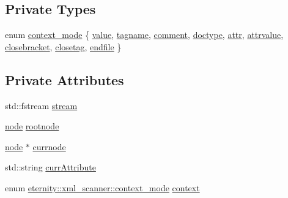 \subsection*{Private Types}
\begin{DoxyCompactItemize}
\item 
enum \hyperlink{classeternity_1_1xml__scanner_a97fff18c2e2004f157a42001010b84cf}{context\+\_\+mode} \{ \newline
\hyperlink{classeternity_1_1xml__scanner_a97fff18c2e2004f157a42001010b84cfafa4eb63a1562f8403e6290141b483953}{value}, 
\hyperlink{classeternity_1_1xml__scanner_a97fff18c2e2004f157a42001010b84cfa9f421ec01218dc95c7bbcf16b96e00e5}{tagname}, 
\hyperlink{classeternity_1_1xml__scanner_a97fff18c2e2004f157a42001010b84cfa72a94f7b59d1b819aee70647064ac738}{comment}, 
\hyperlink{classeternity_1_1xml__scanner_a97fff18c2e2004f157a42001010b84cfa3f58de11b0fa73c3cfae9a0f990ced7d}{doctype}, 
\newline
\hyperlink{classeternity_1_1xml__scanner_a97fff18c2e2004f157a42001010b84cfaa4dbf1aab1b22a99e30b0e0e1fc77f88}{attr}, 
\hyperlink{classeternity_1_1xml__scanner_a97fff18c2e2004f157a42001010b84cfa5ea488921462f42a286fe41414bdf6d2}{attrvalue}, 
\hyperlink{classeternity_1_1xml__scanner_a97fff18c2e2004f157a42001010b84cfa7e4bc6d8b6504245a90dd6d7b051fc07}{closebracket}, 
\hyperlink{classeternity_1_1xml__scanner_a97fff18c2e2004f157a42001010b84cfa7b4539cf0e5243f13c04d6e593d24538}{closetag}, 
\newline
\hyperlink{classeternity_1_1xml__scanner_a97fff18c2e2004f157a42001010b84cfa32b17b19272241d2fac98fc778a0d518}{endfile}
 \}
\end{DoxyCompactItemize}
\subsection*{Private Attributes}
\begin{DoxyCompactItemize}
\item 
std\+::fstream \hyperlink{classeternity_1_1xml__scanner_aa2c16eaaca14155bfa84a9b3307b3afe}{stream}
\item 
\hyperlink{classeternity_1_1node}{node} \hyperlink{classeternity_1_1xml__scanner_a5b233a950be70889f4db08d8fa713e66}{rootnode}
\item 
\hyperlink{classeternity_1_1node}{node} $\ast$ \hyperlink{classeternity_1_1xml__scanner_ae40ec446a15f3ed7394d875473be3676}{currnode}
\item 
std\+::string \hyperlink{classeternity_1_1xml__scanner_afe2104df644a31c03e948a9f1e4203b1}{curr\+Attribute}
\item 
enum \hyperlink{classeternity_1_1xml__scanner_a97fff18c2e2004f157a42001010b84cf}{eternity\+::xml\+\_\+scanner\+::context\+\_\+mode} \hyperlink{classeternity_1_1xml__scanner_ab1eb4acdc4a28ccd587413bcc504aa01}{context}
\end{DoxyCompactItemize}


